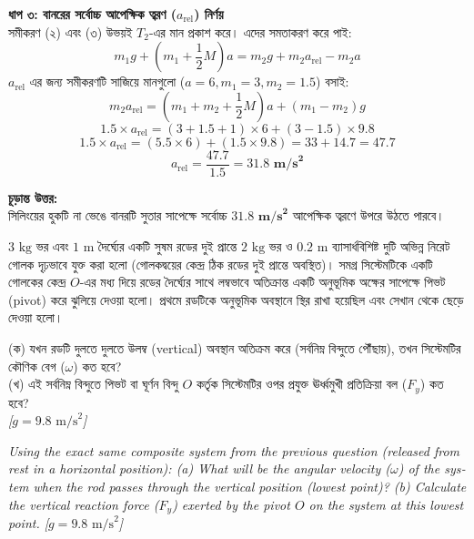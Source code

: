 \documentclass[12pt, a4paper]{article}
\begin{document}
\begin{tcolorbox}[solutionbox={সমাধান (Solution)}]
\vspace{0.5em}
\noindent
\textbf{ধাপ ৩: বানরের সর্বোচ্চ আপেক্ষিক ত্বরণ ($a_{\text{rel}}$) নির্ণয়} \\
সমীকরণ (২) এবং (৩) উভয়ই $T_2$-এর মান প্রকাশ করে। এদের সমতাকরণ করে পাই:
\[ m_1 g + \left(m_1 + \frac{1}{2}M\right)a = m_2 g + m_2 a_{\text{rel}} - m_2 a \]
$a_{\text{rel}}$ এর জন্য সমীকরণটি সাজিয়ে মানগুলো ($a=6, m_1=3, m_2=1.5$) বসাই:
\[ m_2 a_{\text{rel}} = \left(m_1 + m_2 + \frac{1}{2}M\right)a + (m_1 - m_2)g \]
\[ 1.5 \times a_{\text{rel}} = \left(3 + 1.5 + 1\right) \times 6 + (3 - 1.5) \times 9.8 \]
\[ 1.5 \times a_{\text{rel}} = (5.5 \times 6) + (1.5 \times 9.8) = 33 + 14.7 = 47.7 \]
\[ a_{\text{rel}} = \frac{47.7}{1.5} = \mathbf{31.8\text{ m/s}^2} \]

\vspace{1em}
\begin{tcolorbox}[answerbox]
\textbf{চূড়ান্ত উত্তর:} \\
সিলিংয়ের হুকটি না ভেঙে বানরটি সুতার সাপেক্ষে সর্বোচ্চ $\mathbf{31.8 \text{ m/s}^2}$ আপেক্ষিক ত্বরণে উপরে উঠতে পারবে।
\end{tcolorbox}
\end{tcolorbox}

\begin{tcolorbox}[questionbox={প্রশ্ন (Question) 5}]
\noindent
$3\text{ kg}$ ভর এবং $1\text{ m}$ দৈর্ঘ্যের একটি সুষম রডের দুই প্রান্তে $2\text{ kg}$ ভর ও $0.2\text{ m}$ ব্যাসার্ধবিশিষ্ট দুটি অভিন্ন নিরেট গোলক দৃঢ়ভাবে যুক্ত করা হলো (গোলকদ্বয়ের কেন্দ্র ঠিক রডের দুই প্রান্তে অবস্থিত)। সমগ্র সিস্টেমটিকে একটি গোলকের কেন্দ্র $O$-এর মধ্য দিয়ে রডের দৈর্ঘ্যের সাথে লম্বভাবে অতিক্রান্ত একটি অনুভূমিক অক্ষের সাপেক্ষে পিভট (pivot) করে ঝুলিয়ে দেওয়া হলো। প্রথমে রডটিকে অনুভূমিক অবস্থানে স্থির রাখা হয়েছিল এবং সেখান থেকে ছেড়ে দেওয়া হলো। 

\vspace{0.3em}
\noindent
(ক) যখন রডটি দুলতে দুলতে উলম্ব (vertical) অবস্থান অতিক্রম করে (সর্বনিম্ন বিন্দুতে পৌঁছায়), তখন সিস্টেমটির কৌণিক বেগ ($\omega$) কত হবে? \\
(খ) এই সর্বনিম্ন বিন্দুতে পিভট বা ঘূর্ণন বিন্দু $O$ কর্তৃক সিস্টেমটির ওপর প্রযুক্ত ঊর্ধ্বমুখী প্রতিক্রিয়া বল ($F_y$) কত হবে? \\
\textit{[$g = 9.8\text{ m/s}^2$]}

\vspace{0.8em}
\begin{english}
\noindent\textit{\color{darkgray}
Using the exact same composite system from the previous question (released from rest in a horizontal position): (a) What will be the angular velocity ($\omega$) of the system when the rod passes through the vertical position (lowest point)? (b) Calculate the vertical reaction force ($F_y$) exerted by the pivot $O$ on the system at this lowest point. [$g = 9.8\text{ m/s}^2$]
}
\end{english}
\end{tcolorbox}
\end{document}
